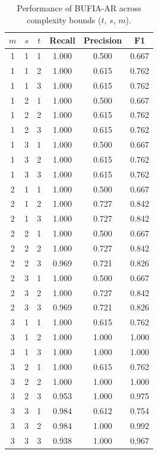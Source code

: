 \begin{table}[ht]
\centering
\small
	\begin{tabular}{cccccc}
	\toprule
	 $m$ & $s$ & $t$ & Recall & Precision & F1    \\
	 \midrule
	  1   & 1   & 1   & 1.000  & 0.500     & 0.667 \\
	  1   & 1   & 2   & 1.000  & 0.615     & 0.762 \\
	  1   & 1   & 3   & 1.000  & 0.615     & 0.762 \\
	  1   & 2   & 1   & 1.000  & 0.500     & 0.667 \\
	  1   & 2   & 2   & 1.000  & 0.615     & 0.762 \\
	  1   & 2   & 3   & 1.000  & 0.615     & 0.762 \\
	  1   & 3   & 1   & 1.000  & 0.500     & 0.667 \\
	  1   & 3   & 2   & 1.000  & 0.615     & 0.762 \\
	  1   & 3   & 3   & 1.000  & 0.615     & 0.762 \\
	  \midrule
	  2   & 1   & 1   & 1.000  & 0.500     & 0.667 \\
	  2   & 1   & 2   & 1.000  & 0.727     & 0.842 \\
	  2   & 1   & 3   & 1.000  & 0.727     & 0.842 \\
	  2   & 2   & 1   & 1.000  & 0.500     & 0.667 \\
	  2   & 2   & 2   & 1.000  & 0.727     & 0.842 \\
	  2   & 2   & 3   & 0.969  & 0.721     & 0.826 \\
	  2   & 3   & 1   & 1.000  & 0.500     & 0.667 \\
	  2   & 3   & 2   & 1.000  & 0.727     & 0.842 \\
	  2   & 3   & 3   & 0.969  & 0.721     & 0.826 \\
	 \midrule
	 3   & 1   & 1   & 1.000  & 0.615     & 0.762 \\
	 3   & 1   & 2   & 1.000  & 1.000     & 1.000 \\
	 3   & 1   & 3   & 1.000  & 1.000     & 1.000 \\
	 3   & 2   & 1   & 1.000  & 0.615     & 0.762 \\
	 3   & 2   & 2   & 1.000  & 1.000     & 1.000 \\
	 3   & 2   & 3   & 0.953  & 1.000     & 0.975 \\
	 3   & 3   & 1   & 0.984  & 0.612     & 0.754 \\
	 3   & 3   & 2   & 0.984  & 1.000     & 0.992 \\
	 3   & 3   & 3   & 0.938  & 1.000     & 0.967 \\
	\bottomrule
	\end{tabular}
\caption{Performance of BUFIA-AR across complexity bounds ($t$, $s$, $m$).}
\label{sec:appendix2}
\end{table}


